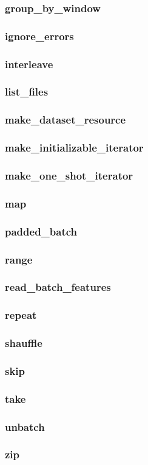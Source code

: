 \subsubsection{group\_by\_window}
\subsubsection{ignore\_errors}
\subsubsection{interleave}
\subsubsection{list\_files}
\subsubsection{make\_dataset\_resource}
\subsubsection{make\_initializable\_iterator}
\subsubsection{make\_one\_shot\_iterator}
\subsubsection{map}
\subsubsection{padded\_batch}
\subsubsection{range}
\subsubsection{read\_batch\_features}
\subsubsection{repeat}
\subsubsection{shauffle}
\subsubsection{skip}
\subsubsection{take}
\subsubsection{unbatch}
\subsubsection{zip}
